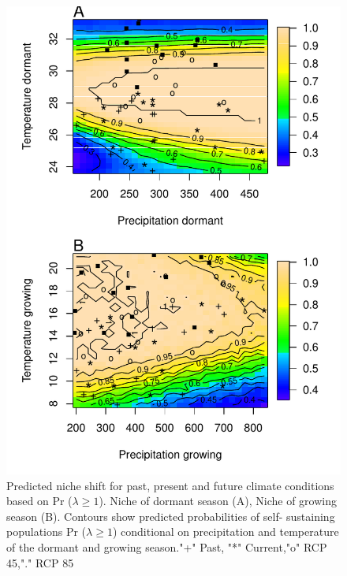 \documentclass[12pt]{article}
\begin{document}
\begin{figure}[H]
  \begin{center}
    \includegraphics[width=0.78\linewidth]{Figures/niche_female_dominant.pdf}
  \caption{Predicted niche shift for past, present and future climate conditions based on Pr ($\lambda \geq 1$). Niche of dormant season (A), Niche of growing season (B). Contours show predicted probabilities of self- sustaining populations Pr ($\lambda \geq 1$) conditional on precipitation and temperature of the dormant and growing season."+" Past, "*" Current,"o" RCP 45,"." RCP 85}
  \label{fig:geoprojfd}
  \end{center}
\end{figure}
\end{document}
